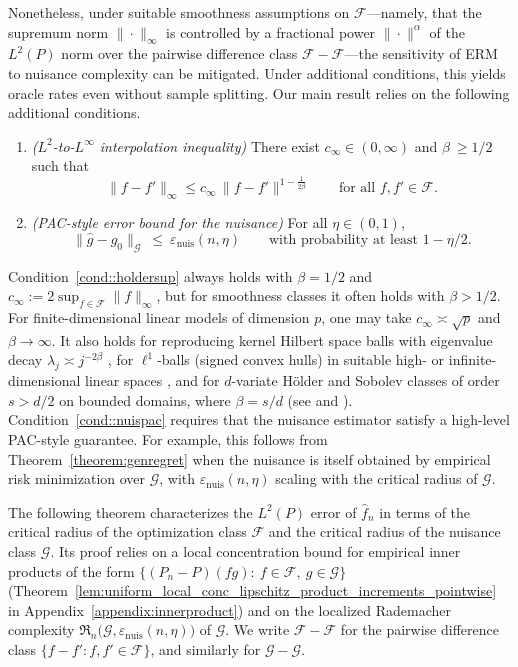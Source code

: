 \documentclass[11pt]{article}
\theoremstyle{plain}
\theoremstyle{definition} %
\begin{document}
Nonetheless, under suitable smoothness assumptions on \(\mathcal F\)—namely, that
the supremum norm \(\|\cdot\|_{\infty}\) is controlled by a fractional power
\(\|\cdot\|^{\alpha}\) of the \(L^2(P)\) norm over the pairwise difference class
\(\mathcal F-\mathcal F\)—the sensitivity of ERM to nuisance complexity can be
mitigated. Under additional conditions, this yields oracle rates even without
sample splitting. Our main result relies on the following additional
conditions.


\begin{enumerate}[label=\bfseries B\arabic*), ref={B\arabic*}, resume=nuis]

\item \textit{\textit{(\(L^2\)-to-\(L^\infty\) interpolation inequality)}} \label{cond::holdersup}
There exist \(c_{\infty} \in (0,\infty)\) and \(\beta\ \geq 1/2\) such that
\[
\|f-f'\|_\infty \le c_{\infty}\,\|f-f'\|^{1 - \tfrac{1}{2\beta}}
\qquad\text{for all } f,f'\in\mathcal F.
\]

\item \textit{(PAC-style error bound for the nuisance)} \label{cond::nuispac}
For all \(\eta\in(0,1)\),
\[
\|\hat g-g_0\|_{\mathcal G}\ \le\ \varepsilon_{\mathrm{nuis}}(n,\eta)
\qquad\text{with probability at least } 1-\eta/2.
\]
\end{enumerate}
Condition~\ref{cond::holdersup} always holds with \(\beta=1/2\) and \(c_\infty := 2\sup_{f\in\mathcal F}\|f\|_\infty\), but for smoothness classes it often holds with \(\beta>1/2\). For finite-dimensional linear models of dimension \(p\), one may take \(c_\infty\asymp \sqrt{p}\) and \(\beta \rightarrow \infty\). It also holds for reproducing kernel Hilbert space balls with eigenvalue decay \(\lambda_j\asymp j^{-2\beta}\) \citep[Lemma~5.1]{mendelson2010regularization}, for \(\ell^1\)-balls (signed convex hulls) in suitable high- or infinite-dimensional linear spaces \citep[Lemma~2.1]{van2014uniform}, and for \(d\)-variate H\"older and Sobolev classes of order \(s>d/2\) on bounded domains, where \(\beta=s/d\) (see \citealt[Lemma~4]{bibaut2021sequential} and \citealt{adams2003sobolev,triebel2006theory}). Condition~\ref{cond::nuispac} requires that the nuisance estimator satisfy a high-level PAC-style guarantee. For example, this follows from Theorem~\ref{theorem:genregret} when the nuisance is itself obtained by empirical risk minimization over \(\mathcal G\), with \(\varepsilon_{\mathrm{nuis}}(n,\eta)\) scaling with the critical radius of \(\mathcal G\).

The following theorem characterizes the \(L^2(P)\) error of \(\hat f_n\) in
terms of the critical radius of the optimization
class \(\mathcal F\) and the critical radius of the nuisance class
\(\mathcal G\). Its proof relies on a local concentration bound for empirical
inner products of the form
\(\{(P_n-P)(fg):\ f\in\mathcal F,\ g\in\mathcal G\}\)
(Theorem~\ref{lem:uniform_local_conc_lipschitz_product_increments_pointwise}
in Appendix~\ref{appendix:innerproduct}) and on the localized Rademacher
complexity
\(\mathfrak{R}_n\bigl(\mathcal G,\varepsilon_{\mathrm{nuis}}(n,\eta)\bigr)\)
of \(\mathcal G\). We write \(\mathcal F-\mathcal F\) for the pairwise
difference class \(\{f-f' : f,f'\in\mathcal F\}\), and similarly for
\(\mathcal G-\mathcal G\).
\end{document}
